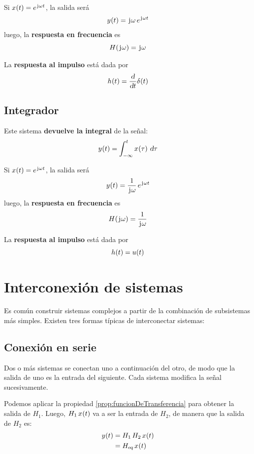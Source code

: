 Si $\fx[x]{t} = e^{\iu \omega t}$, la salida será
\[
    \fx[y]{t} = \iu \omega \, e^{\iu \omega t}
\]
luego, la \textbf{respuesta en frecuencia} es
\[
    \fx[H]{\iu \omega} = \iu \omega
\]

La \textbf{respuesta al impulso} está dada por
\[
    \fx[h]{t} = \frac{\dif}{\dif t} \fx[\delta]{t}
\]

\subsection{Integrador}

Este sistema \textbf{devuelve la integral} de la señal:
\[
    \fx[y]{t} = \int_{-\infty}^{t} \fx[x]{\tau} \, \dif \tau
\]

Si $\fx[x]{t} = e^{\iu \omega t}$, la salida será
\[
    \fx[y]{t} = \frac{1}{\iu \omega} \, e^{\iu \omega t}
\]
luego, la \textbf{respuesta en frecuencia} es
\[
    \fx[H]{\iu \omega} = \frac{1}{\iu \omega}
\]

La \textbf{respuesta al impulso} está dada por
\[
    \fx[h]{t} = \fx[u]{t}
\]

\section{Interconexión de sistemas}

Es común construir sistemas complejos a partir de la combinación de subsistemas más simples.
Existen tres formas típicas de interconectar sistemas:

\subsection{Conexión en serie}

Dos o más sistemas se conectan uno a continuación del otro, de modo que la salida de uno es la entrada del siguiente.
Cada sistema modifica la señal sucesivamente.

\begin{center}
    \def\svgwidth{0.8\linewidth}
    
\end{center}

Podemos aplicar la propiedad \ref{prop:funcionDeTransferencia} para obtener la salida de $H_1$.
Luego, $H_1 \, \fx[x]{t}$ va a ser la entrada de $H_2$, de manera que la salida de $H_2$ es:
\begin{align*}
    \fx[y]{t}
    & = H_1 \, H_2 \, \fx[x]{t}
    \\
    & = \sub{H}{eq} \, \fx[x]{t}
\end{align*}

